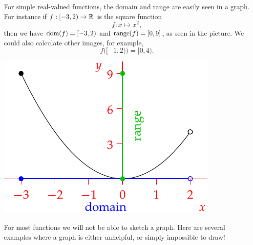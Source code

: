 \begin{minipage}[t]{0.62\linewidth}\vspace{0pt}
		For simple real-valued functions, the domain and range are easily seen in a graph. For instance if $f:[-3,2)\to\mathbb{R}$ is the square function
		\[f:x\mapsto x^2,\]
		then we have $\operatorname{dom}(f)=[-3,2)$ and $\operatorname{range}(f)=[0,9]$, as seen in the picture. We could also calculate other images, for example,
  	\[f\bigl([-1,2)\bigr)=[0,4).\]
  \end{minipage}\hfill
  \begin{minipage}[t]{0.33\linewidth}\vspace{0pt}
  \includegraphics[scale=1]{sets-10-rangedom}
  \end{minipage}\par
  
 For most functions we will not be able to sketch a graph. Here are several examples where a graph is either unhelpful, or simply impossible to draw!
  
